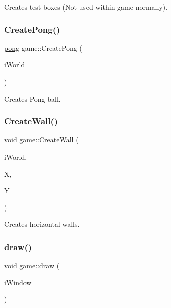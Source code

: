 Creates test boxes (Not used within game normally). 

\mbox{\label{classgame_aa1ba656bd20a57049233b02d247ff24b}} 
\subsubsection{\texorpdfstring{Create\+Pong()}{CreatePong()}}
{\footnotesize\ttfamily \hyperlink{classpong}{pong} game\+::\+Create\+Pong (\begin{DoxyParamCaption}\item[{b2\+World \&}]{i\+World }\end{DoxyParamCaption})}



Creates Pong ball. 

\mbox{\label{classgame_acdaf7a10e6f337765c240aa00c98bb29}} 
\subsubsection{\texorpdfstring{Create\+Wall()}{CreateWall()}}
{\footnotesize\ttfamily void game\+::\+Create\+Wall (\begin{DoxyParamCaption}\item[{b2\+World \&}]{i\+World,  }\item[{float}]{X,  }\item[{float}]{Y }\end{DoxyParamCaption})}



Creates horizontal walls. 

\mbox{\label{classgame_a7d9e3663af2341b48d6de562554f47b1}} 
\subsubsection{\texorpdfstring{draw()}{draw()}}
{\footnotesize\ttfamily void game\+::draw (\begin{DoxyParamCaption}\item[{sf\+::\+Render\+Window \&}]{i\+Window }\end{DoxyParamCaption})\hspace{0.3cm}{\ttfamily [virtual]}}



